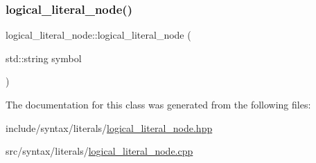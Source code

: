 \subsubsection{\texorpdfstring{logical\+\_\+literal\+\_\+node()}{logical\_literal\_node()}}
{\footnotesize\ttfamily logical\+\_\+literal\+\_\+node\+::logical\+\_\+literal\+\_\+node (\begin{DoxyParamCaption}\item[{std\+::string}]{symbol }\end{DoxyParamCaption})}



The documentation for this class was generated from the following files\+:\begin{DoxyCompactItemize}
\item 
include/syntax/literals/\hyperlink{logical__literal__node_8hpp}{logical\+\_\+literal\+\_\+node.\+hpp}\item 
src/syntax/literals/\hyperlink{logical__literal__node_8cpp}{logical\+\_\+literal\+\_\+node.\+cpp}\end{DoxyCompactItemize}
